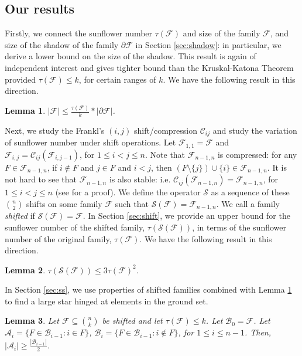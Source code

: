 \documentclass[runningheads,12pt,a4paper]{article}
\newtheorem{lemma}{Lemma}
\begin{document}
	\subsection*{Our results}
	Firstly, we connect the sunflower number $\tau(\mathcal{F})$ and size of the family $\mathcal{F}$, and size of the shadow of the family $\partial \mathcal{F}$ in Section \ref{sec:shadow}: in particular, we derive a lower bound on the size of the shadow. This result is again of independent interest and gives tighter bound than the Kruskal-Katona Theorem provided $\tau(\mathcal{F}) \leq k$, for certain ranges of $k$. We have the following result in this direction.
	\begin{lemma} \label{lemma:4}
		$|\mathcal F| \leq \frac{\tau(\mathcal F)}{k}*|\partial \mathcal F|$.
	\end{lemma} 
	Next, we study the Frankl's $(i,j)$ shift/compression
	$\mathcal{C}_{ij}$ and study the variation of sunflower number under shift operations. Let $\mathcal{F}_{1,1}=\mathcal{F}$ and $\mathcal{F}_{i,j}=\mathcal{C}_{ij}(\mathcal{F}_{i,j-1})$, for $1 \leq i< j \leq n$.  Note that $\mathcal{F}_{n-1,n}$ is compressed: for any $F \in \mathcal{F}_{n-1,n}$, if $i \notin F$ and $j \in F$ and $i<j$, then $(F \setminus \{j\}) \cup \{i\} \in \mathcal{F}_{n-1,n}$. It is not hard to see that $\mathcal{F}_{n-1,n}$ is also stable: i.e. $\mathcal{C}_{ij}(\mathcal{F}_{n-1,n})=\mathcal{F}_{n-1,n}$, for $1 \leq i< j \leq n$ (see \cite{frankl1987} for a proof). We define the operator $\mathcal S$ as a sequence of these $\binom{n}{2}$ shifts on some family  $\mathcal{F}$ such that $\mathcal{S}(\mathcal{F})=\mathcal{F}_{n-1,n}$.
	We call a family \emph{shifted} if  $\mathcal{S}(\mathcal{F})=\mathcal{F}$. In Section \ref{sec:shift}, we provide an upper bound for
	the sunflower number of the shifted family, $\tau(\mathcal{S}(\mathcal{F}))$, in terms of the sunflower number of the original family, $\tau(\mathcal{F})$. 
	We have the following result in this direction.
	\begin{lemma} \label{lemma:3}
		$\tau(\mathcal{S}(\mathcal{F})) \leq 3\tau(\mathcal{F})^2$.
	\end{lemma}

	In Section \ref{sec:ss}, we use properties of shifted families combined with Lemma \ref{lemma:4} to find a large star hinged at elements in the ground set.
	\begin{lemma} \label{lemma:5}
		Let $\mathcal{F} \subseteq \binom{n}{k}$ be shifted and  let $\tau(\mathcal{F}) \leq k$.
		Let $\mathcal{B}_0=\mathcal{F}$.
		Let $\mathcal{A}_i=\{F \in \mathcal{B}_{i-1} : i \in F\}$,
		$\mathcal{B}_i= \{F \in \mathcal{B}_{i-1} : i \notin F\}$, for $1 \leq i \leq n-1$. Then,
		$|\mathcal{A}_i| \geq \frac{|\mathcal{B}_{i-1}|}{2}$.
	\end{lemma}
	
\end{document}
